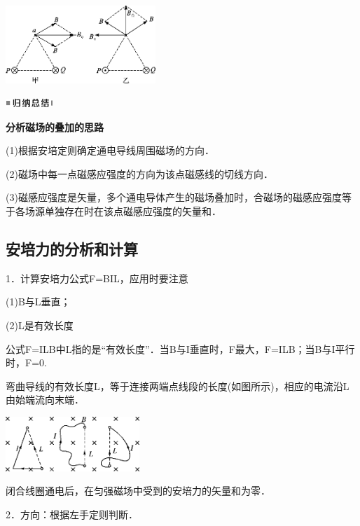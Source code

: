 \begin{center}\includegraphics[width=2.22639in,height=1.16042in]{media/image340.png}\end{center}
\begin{center}\includegraphics[width=0.70764in,height=0.12292in]{media/image13.png}\end{center}
\begin{center}
	\textbf{分析磁场的叠加的思路}
\end{center}

(1)根据安培定则确定通电导线周围磁场的方向．

(2)磁场中每一点磁感应强度的方向为该点磁感线的切线方向．

(3)磁感应强度是矢量，多个通电导体产生的磁场叠加时，合磁场的磁感应强度等于各场源单独存在时在该点磁感应强度的矢量和．

\newpage
\subsection{安培力的分析和计算}
1．计算安培力公式F=BIL，应用时要注意

(1)B与L垂直；

(2)L是有效长度

公式F=ILB中L指的是``有效长度''．当B与I垂直时，F最大，F=ILB；当B与I平行时，F=0.

弯曲导线的有效长度L，等于连接两端点线段的长度(如图所示)，相应的电流沿L由始端流向末端．

\begin{center}\includegraphics[width=1.99028in,height=0.81111in]{media/image341.png}\end{center}

闭合线圈通电后，在匀强磁场中受到的安培力的矢量和为零．

2．方向：根据左手定则判断．

